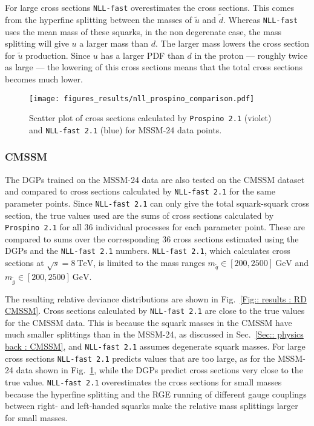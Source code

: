 \documentclass[twoside,english]{uiofysmaster}
\begin{document}
{{For large cross sections \verb|NLL-fast| overestimates the cross sections. This comes from the hyperfine splitting between the masses of $\tilde{u}$ and $\tilde{d}$. Whereas \verb|NLL-fast| uses the mean mass of these squarks, in the non degerenate case, the mass splitting will give $u$ a larger mass than $d$. The larger mass lowers the cross section for $\tilde{u}$ production. Since $u$ has a larger PDF than $d$ in the proton --- roughly twice as large --- the lowering of this cross sections means that the total cross sections becomes much lower.

\begin{figure}
\centering
\texttt{[image: figures\_results/nll\_prospino\_comparison.pdf]}
\caption{Scatter plot of cross sections calculated by {\tt  Prospino 2.1} (violet) and {\tt NLL-fast 2.1} (blue) for MSSM-24 data points.}
\label{Fig:: results : Scatter plot MSSM-24 prospino nll}
\end{figure}

\subsubsection{CMSSM}

The DGPs trained on the MSSM-24 data are also tested on the CMSSM dataset and compared to cross sections calculated by \verb|NLL-fast 2.1| for the same parameter points. Since \verb|NLL-fast 2.1| can only give the total squark-squark cross section, the true values used are the sums of cross sections calculated by \verb|Prospino 2.1| for all 36 individual processes for each parameter point. These are compared to sums over the corresponding 36 cross sections estimated using the DGPs and the \verb|NLL-fast 2.1| numbers. \verb|NLL-fast 2.1|, which calculates cross sections at $\sqrt{s}=8~\mathrm{TeV}$, is limited to the mass ranges $m_{\widetilde{q}} \in [200, 2500]~\mathrm{GeV}$ and $m_{\widetilde{g}} \in [200, 2500]~\mathrm{GeV}$.

The resulting relative deviance distributions are shown in Fig.~\ref{Fig:: results : RD CMSSM}. Cross sections calculated by \verb|NLL-fast 2.1| are close to the true values for the CMSSM data. This is because the squark masses in the CMSSM have much smaller splittings than in the MSSM-24, as discussed in Sec.~\ref{Sec:: physics back : CMSSM}, and \verb|NLL-fast 2.1| assumes degenerate squark masses. For large cross sections \verb|NLL-fast 2.1| predicts values that are too large, as for the MSSM-24 data shown in Fig.~\ref{Fig:: results : Scatter plot MSSM-24 prospino nll}, while the DGPs predict cross sections very close to the true value. \verb|NLL-fast 2.1| overestimates the cross sections for small masses because the hyperfine splitting and the RGE running of different gauge couplings between right- and left-handed squarks make the relative mass splittings larger for small masses.

}}
\end{document}
